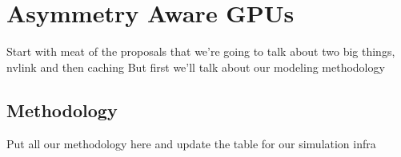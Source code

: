 \section{Asymmetry Aware GPUs}

Start with meat of the proposals that we're going to talk about two big things, nvlink and then caching
But first we'll talk about our modeling methodology


\subsection{Methodology}
\label{methodology}

Put all our methodology here and update the table for our simulation infra

% 

